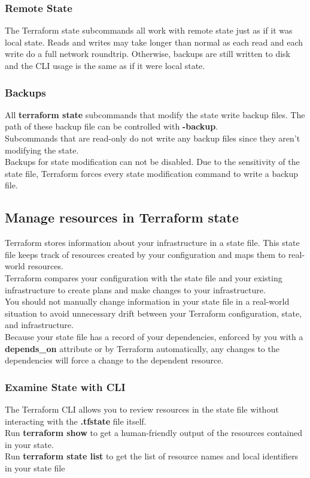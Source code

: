 \documentclass[12pt, letterpaper, twoside]{article}
\begin{document}
\subsubsection{Remote State}
The Terraform state subcommands all work with remote state just as if it was local state.
Reads and writes may take longer than normal as each read and each write do a full network roundtrip. 
Otherwise, backups are still written to disk and the CLI usage is the same as if it were local state.

\subsubsection{Backups}
All \textbf{terraform state} subcommands that modify the state write backup files. 
The path of these backup file can be controlled with \textbf{-backup}.\\
Subcommands that are read-only do not write any backup files since they aren't 
modifying the state.\\
Backups for state modification can not be disabled. Due to the sensitivity of 
the state file, Terraform forces every state modification command to write a 
backup file.

\subsection{Manage resources in Terraform state}
Terraform stores information about your infrastructure in a state file. 
This state file keeps track of resources created by your configuration and maps them 
to real-world resources.\\
Terraform compares your configuration with the state file and your existing 
infrastructure to create plans and make changes to your infrastructure.\\

You should not manually change information in your state file in a real-world 
situation to avoid unnecessary drift between your Terraform configuration, state, 
and infrastructure.\\

Because your state file has a record of your dependencies, enforced by you with a 
\textbf{depends\_on} attribute or by Terraform automatically, any changes to the 
dependencies will force a change to the dependent resource.

\subsubsection{Examine State with CLI}
The Terraform CLI allows you to review resources in the state file without 
interacting with the \textbf{.tfstate} file itself.\\
Run \textbf{terraform show} to get a human-friendly output of the resources 
contained in your state.\\
Run \textbf{terraform state list} to get the list of resource names and local 
identifiers in your state file
\end{document}
